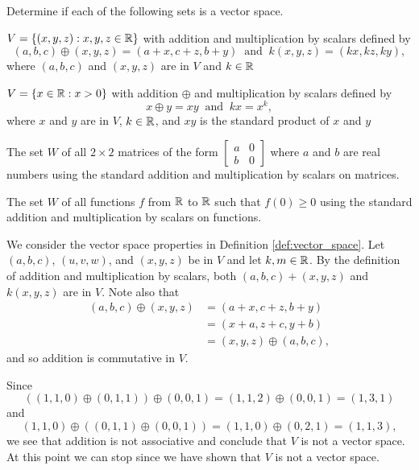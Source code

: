 \begin{example} Determine if each of the following sets is a vector space. 
	\ba
	\item $V = \{(x,y,z) : x,y,z \in \mathbb{R}\}$ with addition and multiplication by scalars defined by
	\[(a,b,c) \oplus (x,y,z) = (a+x, c+z, b+y) \ \text{ and } \ k(x,y,z) = (kx,kz,ky),\]
where $(a,b,c)$ and $(x,y,z)$ are in $V$ and $k \in \mathbb{R}$
	
	\item $V = \{x \in \mathbb{R} : x > 0\}$ with addition $\oplus$ and multiplication by scalars defined by
	\[x \oplus y = xy  \ \text{ and } \ kx = x^k,\]
where $x$ and $y$ are in $V$, $k \in \mathbb{R}$, and $xy$ is the standard product of $x$ and $y$ 

	\item The set $W$ of all $2 \times 2$ matrices of the form $\left[ \begin{array}{cc} a&0\\b&0 \end{array} \right]$ where $a$ and $b$ are real numbers using the standard addition and multiplication by scalars on matrices. 	
	
	\item The set $W$ of all functions $f$ from $\mathbb{R}$ to $\mathbb{R}$ such that $f(0) \geq 0$ using the standard addition and multiplication by scalars on functions. 	
		
	\ea

\ExampleSolution
	\ba
	\item We consider the vector space properties in Definition \ref{def:vector_space}. Let $(a,b,c)$, $(u,v,w)$, and $(x,y,z)$ be in $V$ and let $k,m  \in \mathbb{R}$. By the definition of addition and multiplication by scalars, both $(a,b,c) + (x,y,z)$ and $k (x,y,z)$ are in $V$. Note also that
	\begin{align*}
	(a,b,c) \oplus (x,y,z) &= (a+x, c+z, b+y)  \\
		&= (x+a, z+c, y+b) \\
		&= (x,y,z) \oplus (a,b,c),
	\end{align*}
	and so addition is commutative in $V$.  
	
	Since 
	\[((1,1,0)\oplus(0,1,1)) \oplus (0,0,1) = (1,1,2) \oplus (0,0,1) = (1,3,1)\]
	and 
	\[(1,1,0)\oplus ((0,1,1) \oplus (0,0,1)) = (1,1,0) \oplus (0,2,1) = (1,1,3),\]
	we see that addition is not associative and conclude that $V$ is not a vector space. 
	At this point we can stop since we have shown that $V$ is not a vector space. %
	

\end{example}
